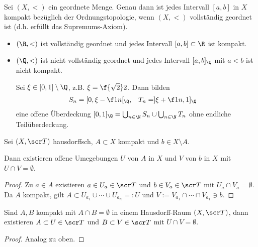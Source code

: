 \begin{st}
	Sei $(X, <)$ ein geordnete Menge.
	Genau dann ist jedes Intervall $[a,b]$ in $X$ kompakt bezüglich der Ordnungstopologie, wenn $(X, <)$ vollständig geordnet ist (d.h. erfüllt das Supremums-Axiom).
\end{st}

\begin{ex}
	\begin{itemize}
		\item
			$(\R, <)$ ist vollständig geordnet und jedes Intervall $[a,b] \subset \R$ ist kompakt.
		\item
			$(\Q, <)$ ist nicht vollständig geordnet und jedes Intervall $[a,b]_\Q$ mit $a<b$ ist nicht kompakt.

			Sei $\xi \in [0,1] \setminus \Q$, z.B. $\xi = \f{\sqrt 2}2$.
			Dann bilden
			\begin{align*}
				S_n &= [0, \xi - \f 1n[_{\Q},&
				T_n &= ]\xi + \f 1n, 1]_{\Q}
			\end{align*}
			eine offene Überdeckung $[0,1]_{\Q} = \bigcup_{n\in\N} S_n \cup \bigcup_{n\in\N} T_n$ ohne endliche Teilüberdeckung.
	\end{itemize}
\end{ex}

\begin{lem}
	Sei $(X, \scr T)$ hausdorffsch, $A \subset X$ kompakt und $b \in X \setminus A$.

	Dann existieren offene Umegebungen $U$ von $A$ in $X$ und $V$ von $b$ in $X$ mit $U\cap V = \emptyset$.
	\begin{proof}
		Zu $a \in A$ existieren $a \in U_a \in \scr T$ und $b \in V_a \in \scr T$ mit $U_a \cap V_a = \emptyset$.
		Da $A$ kompakt, gilt $A \subset U_{a_1} \cup \dotsb \cup U_{a_n} =: U$ und $V := V_{a_1} \cap \dotsb \cap V_{a_1} \ni b$.
	\end{proof}
\end{lem}

\begin{st}
	Sind $A, B$ kompakt mit $A \cap B = \emptyset$ in einem Hausdorff-Raum $(X, \scr T)$, dann existieren $A \subset U \in \scr T$ und $B \subset V \in \scr T$ mit $U \cap V = \emptyset$.
	\begin{proof}
		Analog zu oben.
	\end{proof}
\end{st}

